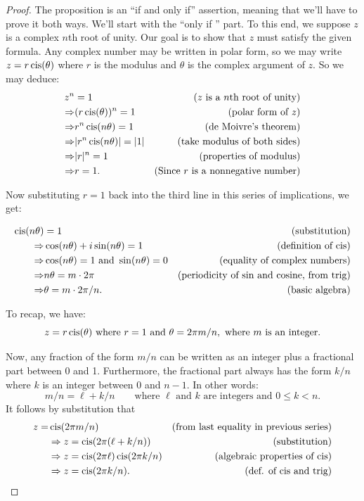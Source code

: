 \begin{proof}
The proposition is an ``if and only if'' assertion, meaning that we'll have to prove it both ways. We'll start with the ``only if '' part.  To this end, we suppose $z$ is a complex $n$th root of unity. Our  goal is to show that $z$ must satisfy the given formula. Any complex number may be written in polar form, so we may write $z = r \operatorname{cis}(\theta)$ where $r$ is the modulus and $\theta$ is the complex argument of $z$.  So we may deduce:
\begin{align*}
z^n &= 1 & (z \text{ is a } n\text{th root of unity})\\
\Rightarrow &(r \operatorname{cis}(\theta))^n=1 & (\text{polar form of } z)\\
\Rightarrow &r^n \operatorname{cis}(n\theta)=1 & (\text{de Moivre's theorem})\\
\Rightarrow &|r^n \operatorname{cis}(n\theta)|=|1| & (\text{take modulus of both sides})\\
\Rightarrow &|r|^n =1 & (\text{properties of modulus})\\
\Rightarrow &r =1. & (\text{Since }r\text{ is a nonnegative number})\\
\end{align*}

\noindent
Now substituting $r=1$ back into the third line in this series of implications, we get:

\begin{align*}
\operatorname{cis}(n\theta)&=1 & (\text{substitution})\\
\Rightarrow &\cos(n\theta) + i\sin(n\theta) =1 & (\text{definition of cis})\\
\Rightarrow &\cos(n\theta)=1 \text{ and } \sin(n\theta)=0 &(\text{equality of complex numbers})\\
\Rightarrow &n\theta = m \cdot 2\pi &\text{(periodicity of sin and cosine, from trig)}\\
\Rightarrow &\theta = m\cdot 2\pi/n. &\text{(basic algebra)}
\end{align*}

\noindent
To recap, we have:
\[z= r \operatorname{cis}(\theta) \text{ where } r=1 \text{ and } \theta = 2\pi m/n, \text{ where }m \text{ is an integer}.\]

Now, any fraction of the form $m/n$ can be written as an integer plus a fractional part between 0 and 1. Furthermore, the fractional part always has the form $k/n$ where $k$ is an integer between 0 and $n-1$. In other words:
\[m/n  = \ell + k/n \qquad \text{where } \ell \text{ and } k \text{ are integers and } 0 \le k < n.\]
It follows by substitution that
\begin{align*}
z= &\operatorname{cis}(2\pi m/n)&\text{(from last equality in previous series)}\\
& \Rightarrow z= \operatorname{cis}(2\pi (\ell + k/n))&\text{(substitution)}\\
& \Rightarrow z= \operatorname{cis}(2\pi\ell) \operatorname{cis}(2\pi k/n)&\text{(algebraic properties of cis)}\\
& \Rightarrow z=  \operatorname{cis}(2\pi k/n).&\text{(def.  of cis and trig)}\\
\end{align*}


\end{proof}
